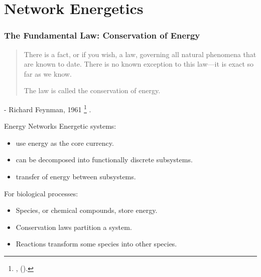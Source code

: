 \documentclass[11pt,reqno]{beamer}
\newcommand{\fcite}[1]{
\footnote{\cite{#1}, (\citeyear{#1}).}
}
\begin{document}
\section{Network Energetics}
\begin{frame}
\frametitle{The Fundamental Law: Conservation of Energy}
\begin{quotation}
There is a fact, or if you wish, a law, governing all natural phenomena that are known to date. There is no known exception to this law—it is exact so far as we know.

The law is called the conservation of energy.
\end{quotation}

\vspace{10pt}
- Richard Feynman, 1961\fcite{Feynman1961}.
\end{frame}
\begin{frame}{Energy Networks}
Energetic systems:
\begin{itemize}
	\item use energy as the core currency.
	\item can be decomposed into functionally discrete subsystems.
	\item transfer of energy between subsystems.
\end{itemize}
\vspace{1cm}
For biological processes:
\begin{itemize}
	\item Species, or chemical compounds, store energy.
	\item Conservation laws partition a system.
	\item Reactions transform some species into other species.
\end{itemize}
\end{frame}





\begin{frame}
\footnotesize
\printbibliography
\end{frame}
\end{document}
